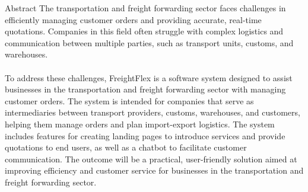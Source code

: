 \begin{preface}{Abstract}
The transportation and freight forwarding sector faces challenges in efficiently managing customer orders and providing accurate, real-time quotations. Companies in this field often struggle with complex logistics and communication between multiple parties, such as transport units, customs, and warehouses.
\\
\\
To address these challenges, FreightFlex is a software system designed to assist businesses in the transportation and freight forwarding sector with managing customer orders. The system is intended for companies that serve as intermediaries between transport providers, customs, warehouses, and customers, helping them manage orders and plan import-export logistics.
The system includes features for creating landing pages to introduce services and provide quotations to end users, as well as a chatbot to facilitate customer communication.
The outcome will be a practical, user-friendly solution aimed at improving efficiency and customer service for businesses in the transportation and freight forwarding sector.
\end{preface}

